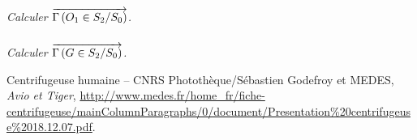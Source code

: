 \documentclass[10pt,oneside]{article}
\begin{document}
\subparagraph{}
\textit{Calculer $\overrightarrow{\Gamma \left( {O_1} \in {S_2}/{S_0}\right)}$.}


\subparagraph{}
\textit{Calculer $\overrightarrow{\Gamma \left( {G} \in {S_2}/{S_0}\right)}$.}


\begin{thebibliography}{2}
 Centrifugeuse humaine -- CNRS Photothèque/Sébastien Godefroy et MEDES, \textit{Avio et Tiger}, \url{http://www.medes.fr/home_fr/fiche-centrifugeuse/mainColumnParagraphs/0/document/Presentation%20centrifugeuse%2018.12.07.pdf}.
\end{thebibliography}
\end{document}
